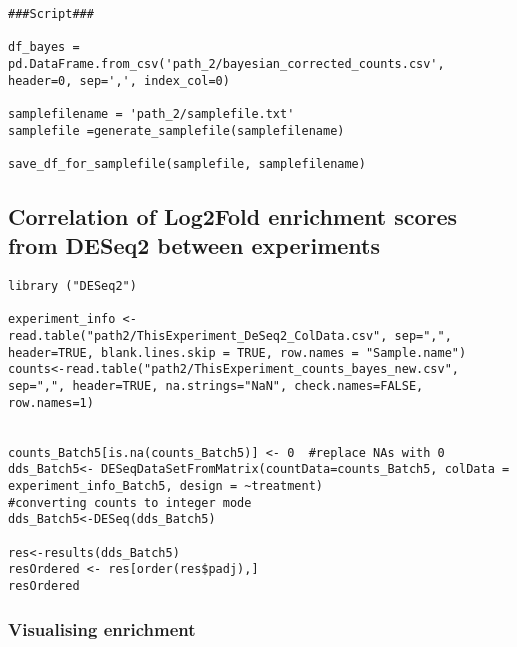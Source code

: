 \begin{footnotesize}
\begin{lstlisting}
###Script###

df_bayes = pd.DataFrame.from_csv('path_2/bayesian_corrected_counts.csv', header=0, sep=',', index_col=0)

samplefilename = 'path_2/samplefile.txt'
samplefile =generate_samplefile(samplefilename)

save_df_for_samplefile(samplefile, samplefilename)
\end{lstlisting}

\subsection{Correlation of Log2Fold enrichment scores from DESeq2 between experiments}

\begin{lstlisting}
library ("DESeq2")

experiment_info <- read.table("path2/ThisExperiment_DeSeq2_ColData.csv", sep=",", header=TRUE, blank.lines.skip = TRUE, row.names = "Sample.name")
counts<-read.table("path2/ThisExperiment_counts_bayes_new.csv", sep=",", header=TRUE, na.strings="NaN", check.names=FALSE, row.names=1)


counts_Batch5[is.na(counts_Batch5)] <- 0  #replace NAs with 0
dds_Batch5<- DESeqDataSetFromMatrix(countData=counts_Batch5, colData = experiment_info_Batch5, design = ~treatment)
#converting counts to integer mode
dds_Batch5<-DESeq(dds_Batch5)

res<-results(dds_Batch5)
resOrdered <- res[order(res$padj),]
resOrdered
\end{lstlisting}



\subsubsection{Visualising enrichment}




\end{footnotesize}
